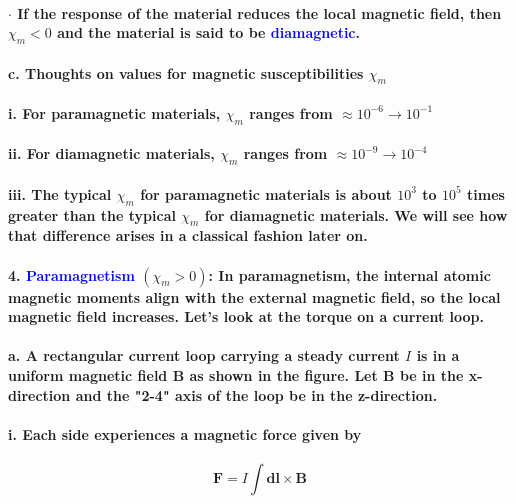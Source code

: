 \documentclass{article}
\begin{document}
\paragraph{\indent\indent $\cdot$ If the response of the material reduces the local magnetic field, then $\chi_m<0$ and the material is said to be \textcolor{blue}{diamagnetic}.}
\paragraph{\indent c. Thoughts on values for magnetic susceptibilities $\chi_m$}
\paragraph{\indent\indent i. For paramagnetic materials, $\chi_m$ ranges from $\approx 10^{-6}\rightarrow 10^{-1}$}
\paragraph{\indent\indent ii. For diamagnetic materials, $\chi_m$ ranges from $\approx 10^{-9}\rightarrow 10^{-4}$}
\paragraph{\indent\indent iii. The typical $\chi_m$ for paramagnetic materials is about $10^3$ to $10^5$ times greater than the typical $\chi_m$ for diamagnetic materials. We will see how that difference arises in a classical fashion later on.}
\paragraph{4. \textcolor{blue}{Paramagnetism} $(\chi_m>0)$: In paramagnetism, the internal atomic magnetic moments align with the external magnetic field, so the local magnetic field increases. Let's look at the torque on a current loop.}
\paragraph{\indent a. A rectangular current loop carrying a steady current $I$ is in a uniform magnetic field $\boldsymbol{B}$ as shown in the figure. Let $\boldsymbol{B}$ be in the x-direction and the "2-4" axis of the loop be in the z-direction.}
\paragraph{\indent\indent i. Each side experiences a magnetic force given by}
\begin{equation*}
    \boldsymbol{F}=I\int\boldsymbol{dl}\times\boldsymbol{B}
\end{equation*}
\end{document}
